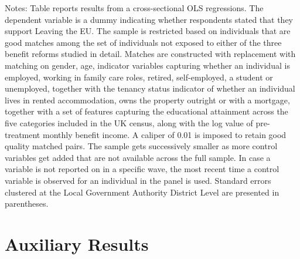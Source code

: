 \documentclass[[a4paper,11pt]{article}
\newcommand\startappendixtablesC{%
    \makeatletter
       \setcounter{table}{0}
   \setcounter{table}{0}\global\def\thetable{C\arabic{table}}%
    \makeatother}
\newcommand\startappendixfiguresC{%
    \makeatletter
       \setcounter{figure}{0}
   \setcounter{figure}{0}\global\def\thefigure{C\arabic{figure}}%
    \makeatother}
\begin{document}
\begin{landscape}
\begin{table}[tbp]
{\begin{threeparttable}
\begin{tabular}{l*{8}{c}}
\bottomrule
\end{tabular}
    \begin{tablenotes} {\footnotesize
\item Notes: Table reports results from a cross-sectional OLS regressions. The dependent variable is a dummy indicating whether respondents stated that they support Leaving the EU. The sample is restricted based on individuals that are good matches among the set of individuals not exposed to either of the three benefit reforms studied in detail. Matches are constructed with replacement with matching on gender, age, indicator variables capturing whether an individual is employed, working in family care roles, retired, self-employed, a student or unemployed, together with the tenancy status indicator of whether an individual lives in rented accommodation, owns the property outright or with a mortgage, together with a set of features capturing the educational attainment across the five categories included in the UK census, along with the log value of pre-treatment monthly benefit income. A caliper of 0.01 is imposed to retain good quality matched pairs. The sample gets successively smaller as more control variables get added that are not available across the full sample. In case a variable is not reported on in a specific wave, the most recent time a control variable is observed for an individual in the panel is used. Standard errors clustered at the Local Government Authority District Level are presented in parentheses.} \end{tablenotes}
      \end{threeparttable}
      
 }
      
\end{table}
\end{landscape}





\clearpage
\newpage
\startappendixtablesC{}
\startappendixfiguresC{}
\section{Auxiliary Results\label{app:sectionC}}
\end{document}
